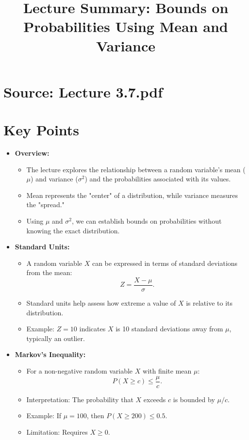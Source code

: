 \documentclass{article}
\title{Lecture Summary: Bounds on Probabilities Using Mean and Variance}
\author{}
\date{}
\begin{document}
\maketitle

\section*{Source: Lecture 3.7.pdf}

\section*{Key Points}

\begin{itemize}
  \item \textbf{Overview:}
    \begin{itemize}
      \item The lecture explores the relationship between a random variable's mean ($\mu$) and variance ($\sigma^2$) and the probabilities associated with its values.
      \item Mean represents the "center" of a distribution, while variance measures the "spread."
      \item Using $\mu$ and $\sigma^2$, we can establish bounds on probabilities without knowing the exact distribution.
    \end{itemize}

  \item \textbf{Standard Units:}
    \begin{itemize}
      \item A random variable $X$ can be expressed in terms of standard deviations from the mean:
        \[
          Z = \frac{X - \mu}{\sigma}.
        \]
      \item Standard units help assess how extreme a value of $X$ is relative to its distribution.
      \item Example: $Z = 10$ indicates $X$ is 10 standard deviations away from $\mu$, typically an outlier.
    \end{itemize}

  \item \textbf{Markov's Inequality:}
    \begin{itemize}
      \item For a non-negative random variable $X$ with finite mean $\mu$:
        \[
          P(X \geq c) \leq \frac{\mu}{c}.
        \]
      \item Interpretation: The probability that $X$ exceeds $c$ is bounded by $\mu / c$.
      \item Example: If $\mu = 100$, then $P(X \geq 200) \leq 0.5$.
      \item Limitation: Requires $X \geq 0$.
    \end{itemize}


\end{itemize}
\end{document}
